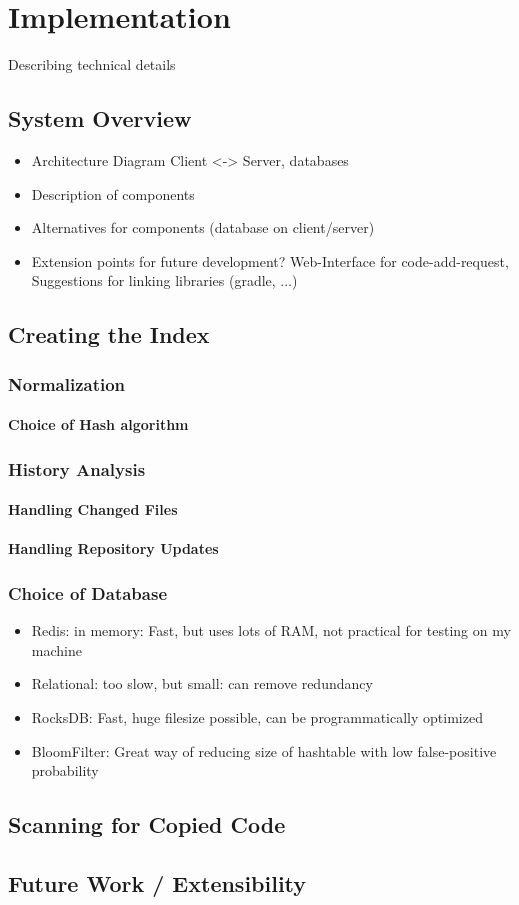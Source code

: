
\chapter{Implementation}\label{chapter:implementation}
Describing technical details %

\section{System Overview}
\begin{itemize}
    \item Architecture Diagram Client <-> Server, databases
    \item Description of components
    \item Alternatives for components (database on client/server)
    \item Extension points for future development? Web-Interface for code-add-request, Suggestions for linking libraries (gradle, ...)
\end{itemize}
\section{Creating the Index}
\subsection{Normalization}
\subsubsection{Choice of Hash algorithm}
\subsection{History Analysis}
\subsubsection{Handling Changed Files}
\subsubsection{Handling Repository Updates}
\subsection{Choice of Database}
\begin{itemize}
    \item Redis: in memory: Fast, but uses lots of RAM, not practical for testing on my machine
    \item Relational: too slow, but small: can remove redundancy
    \item RocksDB: Fast, huge filesize possible, can be programmatically optimized
    \item BloomFilter: Great way of reducing size of hashtable with low false-positive probability %
\end{itemize}
\section{Scanning for Copied Code}
\section{Future Work / Extensibility}
